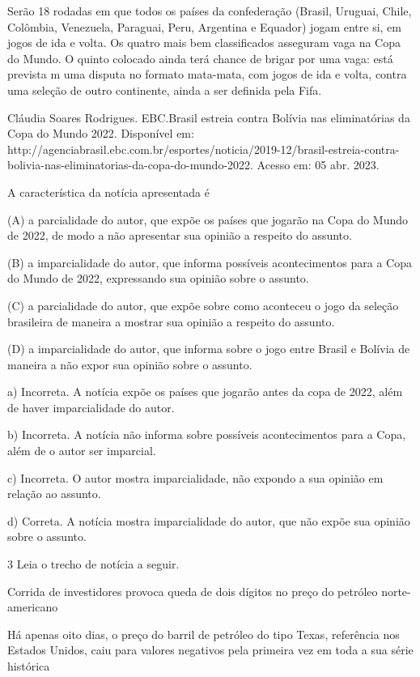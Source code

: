 \begin{itemize}
\begin{itemize}
Serão 18 rodadas em que todos os países da confederação (Brasil,
Uruguai, Chile, Colômbia, Venezuela, Paraguai, Peru, Argentina e
Equador) jogam entre si, em jogos de ida e volta. Os quatro mais bem
classificados asseguram vaga na Copa do Mundo. O quinto colocado ainda
terá chance de brigar por uma vaga: está prevista m uma disputa no
formato mata-mata, com jogos de ida e volta, contra uma seleção de outro
continente, ainda a ser definida pela Fifa.

Cláudia Soares Rodrigues. EBC.Brasil estreia contra Bolívia nas
eliminatórias da Copa do Mundo 2022. Disponível em:
http://agenciabrasil.ebc.com.br/esportes/noticia/2019-12/brasil-estreia-contra-bolivia-nas-eliminatorias-da-copa-do-mundo-2022.
Acesso em: 05 abr. 2023.

A característica da notícia apresentada é

(A) a parcialidade do autor, que expõe os países que jogarão na Copa do
Mundo de 2022, de modo a não apresentar sua opinião a respeito do
assunto.

(B) a imparcialidade do autor, que informa possíveis acontecimentos para
a Copa do Mundo de 2022, expressando sua opinião sobre o assunto.

(C) a parcialidade do autor, que expõe sobre como aconteceu o jogo da
seleção brasileira de maneira a mostrar sua opinião a respeito do
assunto.

(D) a imparcialidade do autor, que informa sobre o jogo entre Brasil e
Bolívia de maneira a não expor sua opinião sobre o assunto.


a) Incorreta. A notícia expõe os países que jogarão antes da copa de
2022, além de haver imparcialidade do autor.

b) Incorreta. A notícia não informa sobre possíveis acontecimentos para
a Copa, além de o autor ser imparcial.

c) Incorreta. O autor mostra imparcialidade, não expondo a sua opinião
em relação ao assunto.

d) Correta. A notícia mostra imparcialidade do autor, que não expõe sua
opinião sobre o assunto.

\num{3} Leia o trecho de notícia a seguir.

Corrida de investidores provoca queda de dois dígitos no preço do
petróleo norte-americano

Há apenas oito dias, o preço do barril de petróleo do tipo Texas,
referência nos Estados Unidos, caiu para valores negativos pela primeira
vez em toda a sua série histórica


\end{itemize}
\end{itemize}
